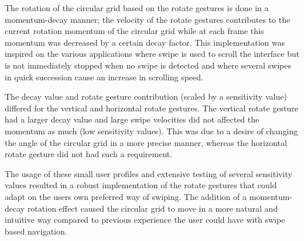 The rotation of the circular grid based on the rotate gestures is
done in a momentum-decay manner; the velocity of the rotate gestures
contributes to the current rotation momentum of the circular grid
while at each frame this momentum was decreased by a certain decay
factor. This implementation was inspired on the various applications
where swipe is used to scroll the interface but is not immediately
stopped when no swipe is detected and where several swipes in quick
succession cause an increase in scrolling speed. 

The decay value and rotate gesture contribution (scaled by a sensitivity
value) differed for the vertical and horizontal rotate gestures. The
vertical rotate gesture had a larger decay value and large swipe velocities
did not affected the momentum as much (low sensitivity values). This
was due to a desire of changing the angle of the circular grid in
a more precise manner, whereas the horizontal rotate gesture did not
had such a requirement.

The usage of these small user profiles and extensive testing of several
sensitivity values resulted in a robust implementation of the rotate
gestures that could adapt on the users own preferred way of swiping.
The addition of a momentum-decay rotation effect caused the circular
grid to move in a more natural and intuitive way compared to previous
experience the user could have with swipe based navigation.